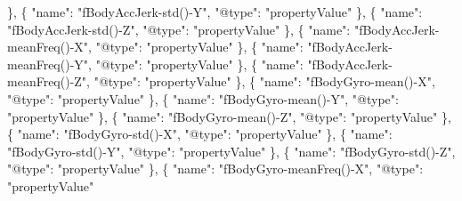 \documentclass[
]{article}
\newenvironment{Shaded}{\begin{snugshade}}{\end{snugshade}}
\newcommand{\DataTypeTok}[1]{\textcolor[rgb]{0.13,0.29,0.53}{#1}}
\newcommand{\FunctionTok}[1]{\textcolor[rgb]{0.00,0.00,0.00}{#1}}
\newcommand{\OtherTok}[1]{\textcolor[rgb]{0.56,0.35,0.01}{#1}}
\newcommand{\StringTok}[1]{\textcolor[rgb]{0.31,0.60,0.02}{#1}}
\begin{document}
\begin{Shaded}
\begin{Highlighting}[]
    \FunctionTok{\}}\OtherTok{,}
    \FunctionTok{\{}
      \DataTypeTok{"name"}\FunctionTok{:} \StringTok{"fBodyAccJerk{-}std(){-}Y"}\FunctionTok{,}
      \DataTypeTok{"@type"}\FunctionTok{:} \StringTok{"propertyValue"}
    \FunctionTok{\}}\OtherTok{,}
    \FunctionTok{\{}
      \DataTypeTok{"name"}\FunctionTok{:} \StringTok{"fBodyAccJerk{-}std(){-}Z"}\FunctionTok{,}
      \DataTypeTok{"@type"}\FunctionTok{:} \StringTok{"propertyValue"}
    \FunctionTok{\}}\OtherTok{,}
    \FunctionTok{\{}
      \DataTypeTok{"name"}\FunctionTok{:} \StringTok{"fBodyAccJerk{-}meanFreq(){-}X"}\FunctionTok{,}
      \DataTypeTok{"@type"}\FunctionTok{:} \StringTok{"propertyValue"}
    \FunctionTok{\}}\OtherTok{,}
    \FunctionTok{\{}
      \DataTypeTok{"name"}\FunctionTok{:} \StringTok{"fBodyAccJerk{-}meanFreq(){-}Y"}\FunctionTok{,}
      \DataTypeTok{"@type"}\FunctionTok{:} \StringTok{"propertyValue"}
    \FunctionTok{\}}\OtherTok{,}
    \FunctionTok{\{}
      \DataTypeTok{"name"}\FunctionTok{:} \StringTok{"fBodyAccJerk{-}meanFreq(){-}Z"}\FunctionTok{,}
      \DataTypeTok{"@type"}\FunctionTok{:} \StringTok{"propertyValue"}
    \FunctionTok{\}}\OtherTok{,}
    \FunctionTok{\{}
      \DataTypeTok{"name"}\FunctionTok{:} \StringTok{"fBodyGyro{-}mean(){-}X"}\FunctionTok{,}
      \DataTypeTok{"@type"}\FunctionTok{:} \StringTok{"propertyValue"}
    \FunctionTok{\}}\OtherTok{,}
    \FunctionTok{\{}
      \DataTypeTok{"name"}\FunctionTok{:} \StringTok{"fBodyGyro{-}mean(){-}Y"}\FunctionTok{,}
      \DataTypeTok{"@type"}\FunctionTok{:} \StringTok{"propertyValue"}
    \FunctionTok{\}}\OtherTok{,}
    \FunctionTok{\{}
      \DataTypeTok{"name"}\FunctionTok{:} \StringTok{"fBodyGyro{-}mean(){-}Z"}\FunctionTok{,}
      \DataTypeTok{"@type"}\FunctionTok{:} \StringTok{"propertyValue"}
    \FunctionTok{\}}\OtherTok{,}
    \FunctionTok{\{}
      \DataTypeTok{"name"}\FunctionTok{:} \StringTok{"fBodyGyro{-}std(){-}X"}\FunctionTok{,}
      \DataTypeTok{"@type"}\FunctionTok{:} \StringTok{"propertyValue"}
    \FunctionTok{\}}\OtherTok{,}
    \FunctionTok{\{}
      \DataTypeTok{"name"}\FunctionTok{:} \StringTok{"fBodyGyro{-}std(){-}Y"}\FunctionTok{,}
      \DataTypeTok{"@type"}\FunctionTok{:} \StringTok{"propertyValue"}
    \FunctionTok{\}}\OtherTok{,}
    \FunctionTok{\{}
      \DataTypeTok{"name"}\FunctionTok{:} \StringTok{"fBodyGyro{-}std(){-}Z"}\FunctionTok{,}
      \DataTypeTok{"@type"}\FunctionTok{:} \StringTok{"propertyValue"}
    \FunctionTok{\}}\OtherTok{,}
    \FunctionTok{\{}
      \DataTypeTok{"name"}\FunctionTok{:} \StringTok{"fBodyGyro{-}meanFreq(){-}X"}\FunctionTok{,}
      \DataTypeTok{"@type"}\FunctionTok{:} \StringTok{"propertyValue"}

\end{Highlighting}
\end{Shaded}
\end{document}
